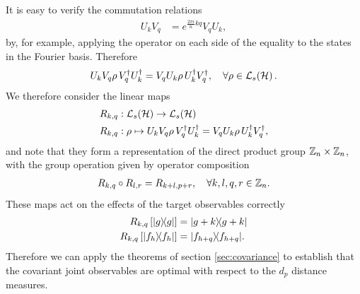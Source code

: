 It is easy to verify the commutation relations
\begin{align}
  U_k V_q  &= e^{\frac{2\pi i}{n} kq}  V_q U_k,
\end{align}
by, for example, applying the operator on each side of the equality to the states in the Fourier basis. Therefore
\begin{align}
  U_k V_q \rho\, V_q^\dagger U^\dagger_k = V_q U_k \rho\,  U^\dagger_k V_q^\dagger, \quad \forall \rho\in\saops[\hcal].
\end{align}
We therefore consider the linear maps
\begin{align}
  R_{k,q}&:\saops[\hcal]\to \saops[\hcal]\\
  R_{k,q}&:\rho \mapsto U_k V_q \rho\, V^\dagger_q U^\dagger_k =  V_q U_k  \rho\,  U^\dagger_k V^\dagger_q,
\end{align}
and note that they form a representation of the direct product group $\cyc[n]\times\cyc[n]$, with the group operation given by operator composition
\begin{align}
  R_{k,q} \circ R_{l,r} = R_{k+l, p+r}, \quad \forall k,l,q,r\in \cyc[n].
\end{align}
These maps act on the effects of the target observables correctly
\begin{align}
  R_{k,q}\left[|g\rangle\!\langle g|\right] &=  |g+k\rangle\!\langle g+k|\\
  R_{k,q}\left[|f_h\rangle\!\langle f_h|\right] &=  |f_{h+q}\rangle\!\langle f_{h+q}|.
\end{align}
Therefore we can apply the theorems of section \ref{sec:covariance} to establish that the covariant joint observables are optimal with respect to the $d_p$ distance measures.


